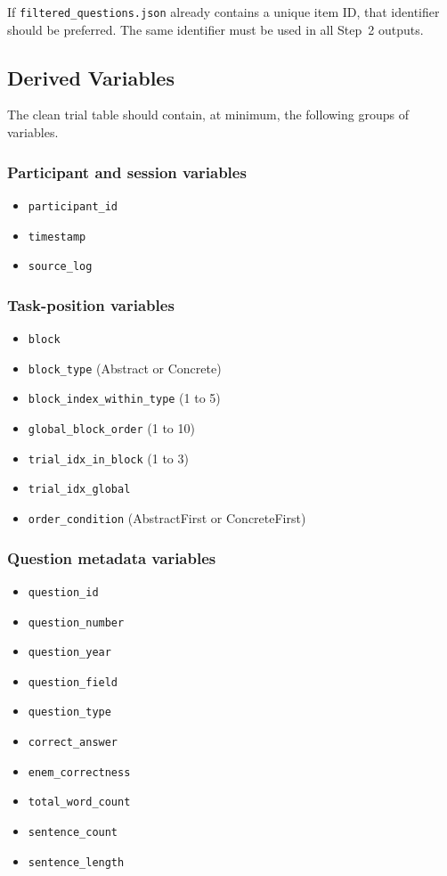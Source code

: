 \documentclass[11pt]{article}
\begin{document}
If \texttt{filtered\_questions.json} already contains a unique item ID, that identifier should be preferred.
The same identifier must be used in all Step~2 outputs.

\subsection{Derived Variables}
The clean trial table should contain, at minimum, the following groups of variables.

\subsubsection*{Participant and session variables}
\begin{itemize}
    \item \texttt{participant\_id}
    \item \texttt{timestamp}
    \item \texttt{source\_log}
\end{itemize}

\subsubsection*{Task-position variables}
\begin{itemize}
    \item \texttt{block}
    \item \texttt{block\_type} (Abstract or Concrete)
    \item \texttt{block\_index\_within\_type} (1 to 5)
    \item \texttt{global\_block\_order} (1 to 10)
    \item \texttt{trial\_idx\_in\_block} (1 to 3)
    \item \texttt{trial\_idx\_global}
    \item \texttt{order\_condition} (AbstractFirst or ConcreteFirst)
\end{itemize}

\subsubsection*{Question metadata variables}
\begin{itemize}
    \item \texttt{question\_id}
    \item \texttt{question\_number}
    \item \texttt{question\_year}
    \item \texttt{question\_field}
    \item \texttt{question\_type}
    \item \texttt{correct\_answer}
    \item \texttt{enem\_correctness}
    \item \texttt{total\_word\_count}
    \item \texttt{sentence\_count}
    \item \texttt{sentence\_length}
\end{itemize}
\end{document}
